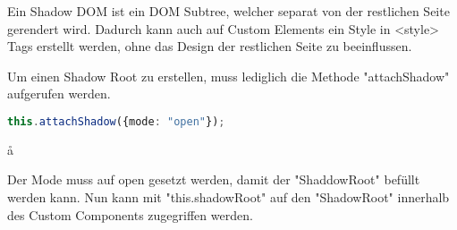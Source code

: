 
Ein Shadow DOM ist ein DOM Subtree, welcher separat von der restlichen Seite gerendert wird. Dadurch kann auch auf Custom Elements ein Style in <style> Tags erstellt werden, ohne das Design der restlichen Seite zu beeinflussen.

Um einen Shadow Root zu erstellen, muss lediglich die Methode "attachShadow" aufgerufen werden. 

\begin{lstlisting}[language=TypeScript,caption={Erstellung eines Shadow Roots}]
this.attachShadow({mode: "open"});
\end{lstlisting}å

Der Mode muss auf open gesetzt werden, damit der "ShaddowRoot" befüllt werden kann. Nun kann mit "this.shadowRoot" auf den "ShadowRoot" innerhalb des Custom Components zugegriffen werden.

\cite{MDNShadowRoot}